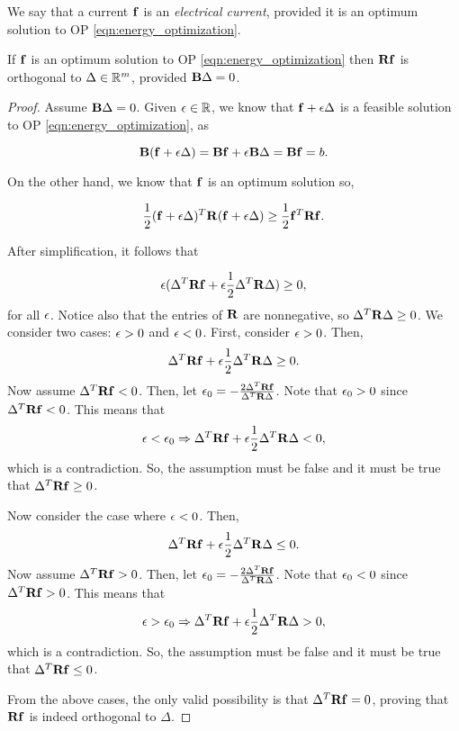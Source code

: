 \documentclass[11pt]{article}
\begin{document}
We say that a current $\V{f}$ is an \textit{electrical current},
provided it is an optimum solution to OP \ref{eqn:energy_optimization}.

\begin{proposition}

If $\V{f}$ is an optimum solution to OP \ref{eqn:energy_optimization}
then $\V{R}\V{f}$ is orthogonal to $\Delta \in \mathbb R^{m}$,
provided $\V{B}\Delta=0$. 


\end{proposition}


\begin{proof}

Assume $\V{B}\Delta = 0$. Given $\epsilon \in \mathbb R$, we know that $\V{f} + \eps \Delta$ is a feasible
solution to OP \ref{eqn:energy_optimization}, as 

\[
	\V{B}(\V{f} + \eps \Delta) = \V{B}\V{f} + \eps \V{B}\Delta = \V{B}\V{f} = b.
\]

On the other
hand, we know that $\V{f}$ is an optimum solution so,

\[
	\frac{1}{2}(\V{f} + \eps \Delta)^{T} \V{R} (\V{f} + \eps \Delta) \ge \frac{1}{2}\V{f}^{T} \V{R} \V{f}.
\]

After simplification, it follows that

\begin{equation}\label{eqn:epsilon_addition}
	\eps( \Delta^{T} \V{R} \V{f} + \eps \frac{1}{2} \Delta^{T} \V{R} \Delta) \ge 0,
\end{equation}
for all $\epsilon$. Notice also that the entries of $\V{R}$ are nonnegative, so $\Delta^{T} \V{R} \Delta \ge 0$. We consider two cases: $\epsilon > 0$ and $\epsilon < 0$. First, consider $\epsilon > 0$. Then,
\begin{equation}
	\Delta^{T} \V{R} \V{f} + \eps \frac{1}{2} \Delta^{T} \V{R} \Delta \ge 0.
\end{equation}
Now assume $\Delta^{T} \V{R} \V{f} < 0$. Then, let $\eps_0 = -\frac{2 \Delta^{T} \V{R} \V{f}}{\Delta^{T} \V{R} \Delta}$. Note that $\epsilon_0 > 0$ since $\Delta^{T} \V{R} \V{f} < 0$. This means that
\[
	\eps < \eps_0 \Rightarrow \Delta^{T} \V{R} \V{f} + \eps \frac{1}{2} \Delta^{T} \V{R} \Delta < 0,
\]
which is a contradiction. So, the assumption must be false and it must be true that $\Delta^{T} \V{R} \V{f} \ge 0$.

Now consider the case where $\epsilon < 0$. Then,
\begin{equation}
	\Delta^{T} \V{R} \V{f} + \eps \frac{1}{2} \Delta^{T} \V{R} \Delta \le 0.
\end{equation}
Now assume $\Delta^{T} \V{R} \V{f} > 0$. Then, let $\eps_0 = -\frac{2 \Delta^{T} \V{R} \V{f}}{\Delta^{T} \V{R} \Delta}$. Note that $\epsilon_0 < 0$ since $\Delta^{T} \V{R} \V{f} > 0$. This means that
\[
	\eps > \eps_0 \Rightarrow \Delta^{T} \V{R} \V{f} + \eps \frac{1}{2} \Delta^{T} \V{R} \Delta > 0,
\]
which is a contradiction. So, the assumption must be false and it must be true that $\Delta^{T} \V{R} \V{f} \le 0$.

From the above cases, the only valid possibility is that $\Delta^{T} \V{R} \V{f} = 0$, proving that $\V{R} \V{f}$ is indeed orthogonal to $\Delta$.
\end{proof}
\end{document}
